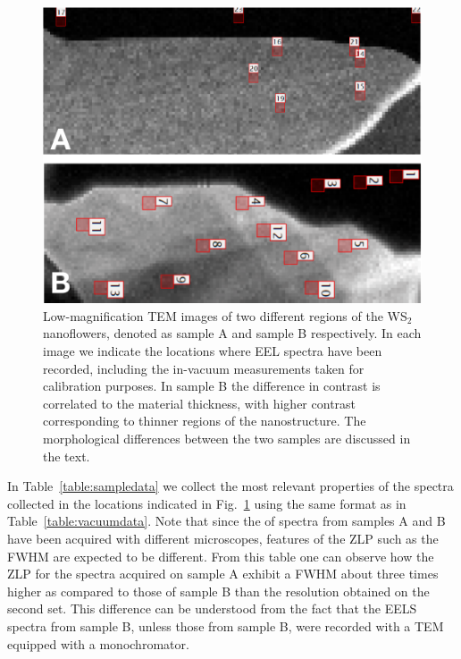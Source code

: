 \begin{figure}[t]
\begin{centering}
  \includegraphics[width=0.87\linewidth]{plots/Spectra_location.pdf}
  \caption{Low-magnification TEM images of two different regions of
    the WS$_2$ nanoflowers, denoted as sample A and sample B respectively.
    In each image we indicate the locations where
    EEL spectra have been recorded, including the in-vacuum measurements taken
    for calibration purposes.
    In sample B the difference in contrast is correlated to the material
    thickness, with higher contrast corresponding to thinner regions of the nanostructure.
    The morphological differences between the two samples are discussed in the text.
  }
\label{fig:ws2positions}
\end{centering}
\end{figure}

In Table~\ref{table:sampledata} we collect the most relevant properties of the spectra collected
in the locations indicated in Fig.~\ref{fig:ws2positions} using the same format as
in Table~\ref{table:vacuumdata}.
%
Note that since the of spectra from samples A and B
have been acquired with different microscopes, features of the ZLP
such as the FWHM are expected to be different.
%
From this table one can observe how  the ZLP for the spectra acquired on sample A exhibit
a FWHM about three times higher as compared to those of sample B
than the resolution obtained on the second set. 
%
This difference can be understood from the fact that the EELS spectra from sample B, unless those
from sample B,
were recorded with a TEM equipped with a monochromator.

